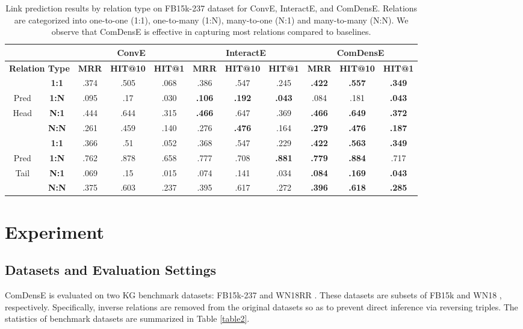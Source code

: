 \begin{table}
\centering
\caption{Link prediction results by relation type on FB15k-237 dataset for ConvE, InteractE, and ComDensE. Relations are categorized into one-to-one (1:1), one-to-many (1:N), many-to-one (N:1) and many-to-many (N:N). We observe that ComDensE is effective in capturing most relations compared to baselines.}
\label{table6}
\begin{tabular}{cc|ccc|ccc|ccc}
\hline
  \multicolumn{2}{c}{} & \multicolumn{3}{c}{\textbf{ConvE}} & \multicolumn{3}{c}{\textbf{InteractE}} &  \multicolumn{3}{c}{\textbf{ComDensE}}\\
 \hline
 \multicolumn{2}{c}{\textbf{Relation Type}} &
 \textbf{MRR} &
 \textbf{HIT@10} &
 \textbf{HIT@1} &
 \textbf{MRR} &
 \textbf{HIT@10} &
 \textbf{HIT@1} &
 \textbf{MRR} &
 \textbf{HIT@10} &
 \textbf{HIT@1} \\
 \hline
 & \textbf{1:1} & .374 &.505 & .068 & .386 & .547 & .245 & \textbf{.422}  & \textbf{.557} & \textbf{.349}\\
 Pred & \textbf{1:N} & .095 & .17 & .030 & \textbf{.106} & \textbf{.192} & \textbf{.043} & .084 & .181 & \textbf{.043}\\
 Head & \textbf{N:1} & .444 & .644 & .315 & \textbf{.466} & .647 & .369 & \textbf{.466} & \textbf{.649} & \textbf{.372}\\
 & \textbf{N:N} & .261 & .459 & .140 & .276 & \textbf{.476} & .164 & \textbf{.279} & \textbf{.476} & \textbf{.187}\\
 \hline
 & \textbf{1:1} & .366 & .51 & .052 & .368 & .547 & .229  & \textbf{.422} & \textbf{.563} & \textbf{.349}\\
 Pred & \textbf{1:N} & .762 & .878 & .658 & .777 & .708 & \textbf{.881} & \textbf{.779} & \textbf{.884} & .717\\
 Tail & \textbf{N:1} & .069 &.15 & .015 & .074 &.141 & .034 & \textbf{.084} & \textbf{.169} & \textbf{.043}\\
 & \textbf{N:N} & .375 & .603 & .237 & .395 & .617 & .272 & \textbf{.396} & \textbf{.618} & \textbf{.285}\\
 \hline
\end{tabular}
\end{table}

\section{Experiment}

\subsection{Datasets and Evaluation Settings}
ComDensE is evaluated on two KG benchmark datasets: FB15k-237 \cite{toutanova2015observed} and WN18RR \cite{dettmers2018convolutional}. These datasets are subsets of FB15k \cite{bordes2013translating} and WN18 \cite{bordes2013translating}, respectively. Specifically, inverse relations are removed from the original datasets so as to prevent direct inference via reversing triples. The statistics of benchmark datasets are summarized in Table \ref{table2}. 


